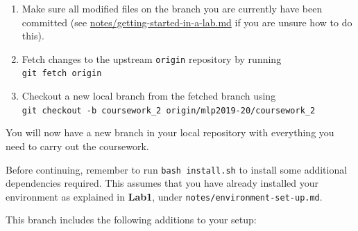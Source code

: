 \documentclass[11pt,]{article}
\begin{document}
\begin{enumerate}
\item
  Make sure all modified files on the branch you are currently have been
  committed
  (see \href{https://github.com/CSTR-Edinburgh/mlpractical/blob/mlp2019-20/master/notes/getting-started-in-a-lab.md}{notes/getting-started-in-a-lab.md} if you are unsure how to do this).
\item
  Fetch changes to the upstream \texttt{origin} repository by running\\
  \texttt{git fetch origin}
\item
  Checkout a new local branch from the fetched branch using\\
  \verb+git checkout -b coursework_2 origin/mlp2019-20/coursework_2+
\end{enumerate}

You will now have a new branch in your local repository with everything you need to carry out the coursework.

Before continuing, remember to run \texttt{bash install.sh} to install some additional dependencies required. This assumes that you have already installed your environment as explained in \textbf{Lab1}, under \texttt{notes/environment-set-up.md}.

This branch includes the following additions to your setup:
\end{document}
